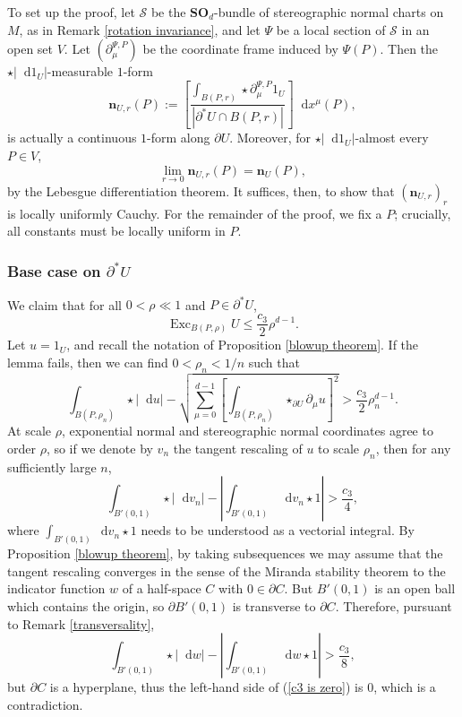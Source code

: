 \documentclass[reqno,10pt]{amsart}
\newcommand{\SpOrth}{\mathbf{SO}}
\DeclareMathOperator{\Exc}{Exc}
\newcommand*\dif{\mathop{}\!\mathrm{d}}
\newcommand{\normal}{\mathbf n}
\theoremstyle{definition}
\numberwithin{equation}{section}
\begin{document}
To set up the proof, let $\mathscr S$ be the $\SpOrth_d$-bundle of stereographic normal charts on $M$, as in Remark \ref{rotation invariance}, and let $\Psi$ be a local section of $\mathscr S$ in an open set $V$.
Let $(\partial^{\Psi, P}_\mu)$ be the coordinate frame induced by $\Psi(P)$.
Then the $\star |\dif 1_U|$-measurable $1$-form
$$\normal_{U,r}(P) := \left[\frac{\int_{B(P, r)} \star \partial_\mu^{\Psi, P} 1_U}{|\partial^* U \cap B(P, r)|}\right] \dif x^\mu(P),$$
is actually a continuous $1$-form along $\partial U$.
Moreover, for $\star |\dif 1_U|$-almost every $P \in V$,
$$\lim_{r \to 0} \normal_{U, r}(P) = \normal_U(P),$$
by the Lebesgue differentiation theorem.
It suffices, then, to show that $(\normal_{U,r})_r$ is locally uniformly Cauchy.
For the remainder of the proof, we fix a $P$; crucially, all constants must be locally uniform in $P$.

\subsubsection{Base case on \texorpdfstring{$\partial^* U$}{the reduced boundary}}
We claim that for all $0 < \rho \ll 1$ and $P \in \partial^* U$,
\begin{equation}\label{Excess is a priori very small}
\Exc_{B(P, \rho)} U \leq \frac{c_3}{2} \rho^{d - 1}.
\end{equation}
Let $u = 1_U$, and recall the notation of Proposition \ref{blowup theorem}. If the lemma fails, then we can find $0 < \rho_n < 1/n$ such that 
$$\int_{B(P, \rho_n)} \star |\dif u| - \sqrt{\sum_{\mu = 0}^{d - 1} \left[\int_{B(P, \rho_n)} \star_{\partial U} \partial_\mu u\right]^2} > \frac{c_3}{2} \rho_n^{d - 1}.$$
At scale $\rho$, exponential normal and stereographic normal coordinates agree to order $\rho$, so if we denote by $v_n$ the tangent rescaling of $u$ to scale $\rho_n$, then for any sufficiently large $n$,
$$\int_{B'(0, 1)} \star |\dif v_n| - \left|\int_{B'(0, 1)} \dif v_n \star 1\right| > \frac{c_3}{4},$$
where $\int_{B'(0, 1)} \dif v_n \star 1$ needs to be understood as a vectorial integral.
By Proposition \ref{blowup theorem}, by taking subsequences we may assume that the tangent rescaling converges in the sense of the Miranda stability theorem to the indicator function $w$ of a half-space $C$ with $0 \in \partial C$.
But $B'(0, 1)$ is an open ball which contains the origin, so $\partial B'(0, 1)$ is transverse to $\partial C$.
Therefore, pursuant to Remark \ref{transversality},
\begin{equation}\label{c3 is zero}
\int_{B'(0, 1)} \star |\dif w| - \left|\int_{B'(0, 1)} \dif w \star 1\right| > \frac{c_3}{8},
\end{equation}
but $\partial C$ is a hyperplane, thus the left-hand side of (\ref{c3 is zero}) is $0$, which is a contradiction.
\end{document}
